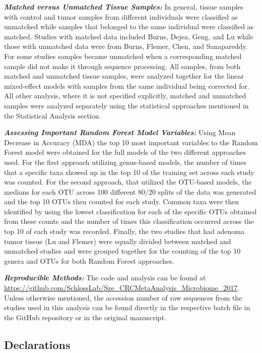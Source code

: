 \documentclass[12pt,]{article}
\begin{document}
\textbf{\emph{Matched versus Unmatched Tissue Samples:}} In general,
tissue samples with control and tumor samples from different individuals
were classified as unmatched while samples that belonged to the same
individual were classified as matched. Studies with matched data
included Burns, Dejea, Geng, and Lu while those with unmatched data were
from Burns, Flemer, Chen, and Sanapareddy. For some studies samples
became unmatched when a corresponding matched sample did not make it
through sequence processing. All samples, from both matched and
unmatched tissue samples, were analyzed together for the linear
mixed-effect models with samples from the same individual being
corrected for. All other analysis, where it is not specified explicitly,
matched and unmatched samples were analyzed separately using the
statistical approaches mentioned in the Statistical Analysis section.

\textbf{\emph{Assessing Important Random Forest Model Variables:}} Using
Mean Decrease in Accuracy (MDA) the top 10 most important variables to
the Random Forest model were obtained for the full models of the two
different approaches used. For the first approach utilizing genus-based
models, the number of times that a specific taxa showed up in the top 10
of the training set across each study was counted. For the second
approach, that utilized the OTU-based models, the medians for each OTU
across 100 different 80/20 splits of the data was generated and the top
10 OTUs then counted for each study. Common taxa were then identified by
using the lowest classification for each of the specific OTUs obtained
from these counts and the number of times this classification occurred
across the top 10 of each study was recorded. Finally, the two studies
that had adenoma tumor tissue (Lu and Flemer) were equally divided
between matched and unmatched studies and were grouped together for the
counting of the top 10 genera and OTUs for both Random Forest
approaches.

\textbf{\emph{Reproducible Methods:}} The code and analysis can be found
at
\url{https://github.com/SchlossLab/Sze_CRCMetaAnalysis_Microbiome_2017}.
Unless otherwise mentioned, the accession number of raw sequences from
the studies used in this analysis can be found directly in the
respective batch file in the GitHub repository or in the original
manuscript.

\newpage

\subsection{Declarations}\label{declarations}
\end{document}
